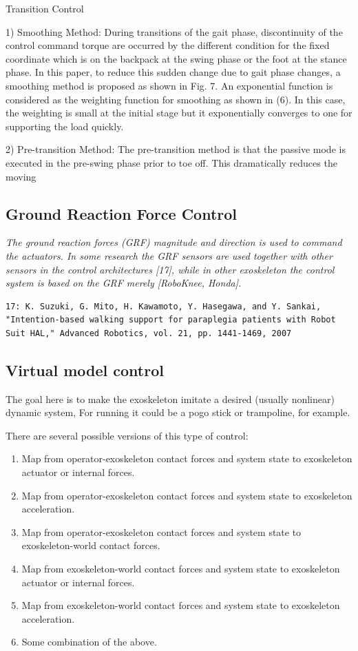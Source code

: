 \documentclass[letterpaper,12pt,fullpage]{article}
\begin{document}
Transition Control

1) Smoothing Method: During transitions of the gait
phase, discontinuity of the control command torque are
occurred by the different condition for the fixed coordinate
which is on the backpack at the swing phase or the foot at
the stance phase. In this paper, to reduce this sudden change
due to gait phase changes, a smoothing method is proposed
as shown in Fig. 7. An exponential function is considered
as the weighting function for smoothing as shown in (6).
In this case, the weighting is small at the initial stage but
it exponentially converges to one for supporting the load
quickly.

2) Pre-transition Method: The pre-transition method is
that the passive mode is executed in the pre-swing phase
prior to toe off. This dramatically reduces the moving

\subsection{Ground Reaction Force Control}

{\it
The ground reaction
forces (GRF) magnitude and direction is used to command the
actuators. In some research the GRF sensors are used
together with other sensors in the control architectures [17],
while in other exoskeleton the control system is based on the
GRF merely [RoboKnee, Honda].
}
\begin{verbatim}
17: K. Suzuki, G. Mito, H. Kawamoto, Y. Hasegawa, and Y. Sankai,
"Intention-based walking support for paraplegia patients with Robot
Suit HAL," Advanced Robotics, vol. 21, pp. 1441-1469, 2007
\end{verbatim}

\subsection{Virtual model control}

The goal here is to make the exoskeleton imitate a desired (usually nonlinear)
dynamic system,
For running it could be a pogo stick or trampoline, for example.

There are several possible versions of this type of control:
\begin{enumerate}
\item
Map from operator-exoskeleton contact forces and system state
to exoskeleton actuator or internal forces.
\item
Map from operator-exoskeleton contact forces and system state
to exoskeleton acceleration.
\item
Map from operator-exoskeleton contact forces and system state
to exoskeleton-world contact forces.
\item
Map from exoskeleton-world contact forces and system state to exoskeleton actuator or internal forces.
\item
Map from exoskeleton-world contact forces and system state to exoskeleton acceleration.
\item
Some combination of the above.
\end{enumerate}
\end{document}
